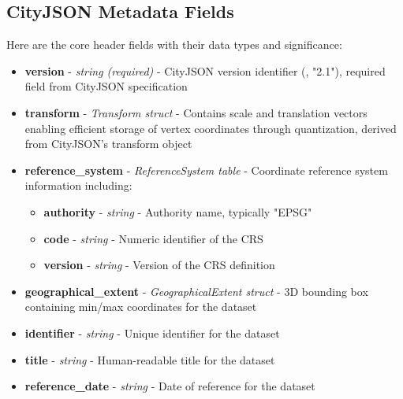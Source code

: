 \subsection{CityJSON Metadata Fields}
\label{methodology:header:cityjson_fields}

Here are the core header fields with their data types and significance:

\begin{itemize}
  \item \textbf{version} - \textit{string (required)} - CityJSON version identifier (\eg, "2.1"), required field from CityJSON specification \citep{cityjson_spec}

  \item \textbf{transform} - \textit{Transform struct} - Contains scale and translation vectors enabling efficient storage of vertex coordinates through quantization, derived from CityJSON's transform object \citep{cityjson_spec}

  \item \textbf{reference\_system} - \textit{ReferenceSystem table} - Coordinate reference system information including:
    \begin{itemize}
      \item \textbf{authority} - \textit{string} - Authority name, typically "EPSG"
      \item \textbf{code} - \textit{string} - Numeric identifier of the CRS
      \item \textbf{version} - \textit{string} - Version of the CRS definition
    \end{itemize}

  \item \textbf{geographical\_extent} - \textit{GeographicalExtent struct} - 3D bounding box containing min/max coordinates for the dataset \citep{cityjson_spec}

  \item \textbf{identifier} - \textit{string} - Unique identifier for the dataset

  \item \textbf{title} - \textit{string} - Human-readable title for the dataset

  \item \textbf{reference\_date} - \textit{string} - Date of reference for the dataset


\end{itemize}
